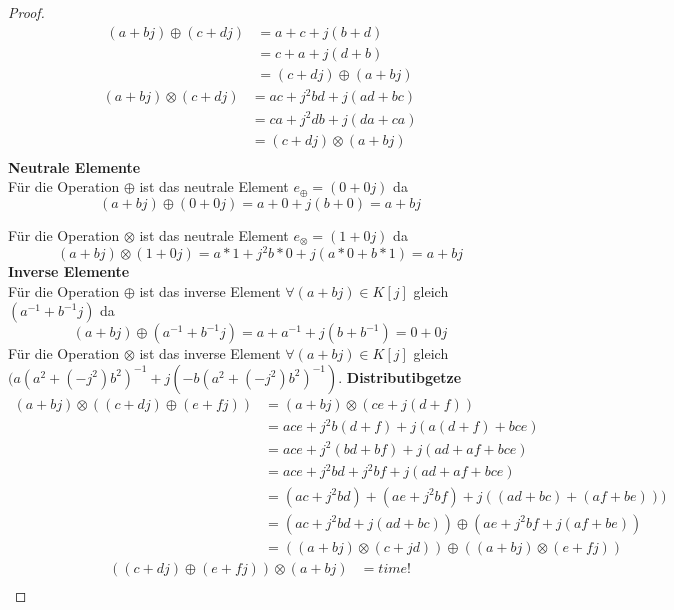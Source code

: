 \documentclass{../problemset}
\begin{document}
\begin{problem}
\begin{proof}
	\begin{align}
		(a + bj) \oplus (c + dj) & = a + c + j(b + d)         \\
		                         & = c + a + j(d + b)         \\
		                         & = (c + dj) \oplus (a + bj)
	\end{align}
	\begin{align}
		(a + bj) \otimes (c + dj) & = ac + j^2bd + j(ad + bc)   \\
		                          & = ca + j^2db + j(da + ca)   \\
		                          & = (c + dj) \otimes (a + bj) \\
	\end{align}
	\textbf{Neutrale Elemente} \\
	Für die Operation $\oplus$ ist das neutrale Element $e_\oplus = (0+0j)$ da \[
		(a + bj) \oplus (0 + 0j)   = a + 0 + j(b + 0) = a + bj
	\]

	Für die Operation $\otimes$ ist das neutrale Element $e_\otimes = (1+0j)$ da \[
		(a + bj) \otimes (1 + 0j)  = a*1 + j^2b*0 + j(a*0 + b*1) = a + bj
	\]
	\textbf{Inverse Elemente} \\
	Für die Operation $\oplus$ ist das inverse Element $\forall (a + bj) \in K[j]$ gleich $(a^{-1}+b^{-1}j)$ da \[
		(a + bj) \oplus (a^{-1} + b^{-1}j) = a + a^{-1} + j(b + b^{-1}) = 0 + 0j
	\]
	Für die Operation $\otimes$ ist das inverse Element $\forall (a + bj) \in K[j]$ gleich $(a{(a^2+(-j^2)b^2)}^{-1} + j(-b{(a^2+(-j^2)b^2)}^{-1})$.
	\textbf{Distributibgetze} \\
	\begin{align}
		(a + bj) \otimes ((c + dj) \oplus (e + fj)) & = (a + bj) \otimes (ce + j(d + f))                               \\
		                                            & = ace + j^2b(d+f) + j(a(d+f) + bce)                              \\
		                                            & = ace + j^2(bd+bf) + j(ad+af + bce)                              \\
		                                            & = ace + j^2bd+j^2bf + j(ad+af + bce)                             \\
		                                            & = (ac + j^2bd) + (ae + j^2bf) + j((ad + bc) + (af + be)))        \\
		                                            & = (ac + j^2bd + j(ad + bc)) \oplus (ae + j^2bf + j(af + be))     \\
		                                            & = ((a + bj) \otimes (c + jd)) \oplus ((a + bj) \otimes (e + fj))
	\end{align}
	\begin{align}
		((c + dj) \oplus (e + fj)) \otimes (a + bj) & = time! \\
	\end{align}
\end{proof}


\end{problem}
\end{document}
